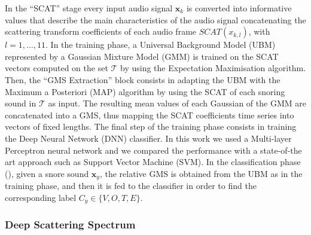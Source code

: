 In the ``SCAT'' stage every input audio signal $\mathbf{x}_{k}$ is converted into informative values that describe the main characteristics of the audio signal concatenating the scattering transform coefficients of each audio frame $SCAT({x}_{k,l})$, with $l=1,\dots,11$.
In the training phase, a Universal Background Model (UBM) represented by a Gaussian Mixture Model (GMM) is trained on the SCAT vectors computed on the set $\mathcal{T}$ by using the Expectation Maximisation algorithm. Then, the ``GMS Extraction'' block consists in adapting the UBM with the Maximum a Posteriori (MAP) algorithm  by using the SCAT of each snoring sound in $\mathcal{T}$ as input. The resulting mean values of each Gaussian of the GMM are concatenated into a GMS, thus mapping the SCAT coefficients time series into vectors of fixed lengths. %
The final step of the training phase consists in training the Deep Neural Network (DNN) classifier. In this work we used a Multi-layer Perceptron neural network and we compared the performance with a state-of-the art approach such as Support Vector Machine (SVM).
In the classification phase (), given a snore sound $\mathbf{x}_y$, the relative GMS is obtained from the UBM as in the training phase, and then it is fed to the classifier in order to find the corresponding label $C_y \in \{V, O, T, E\}$.



%		
%		


\subsubsection{Deep Scattering Spectrum}

